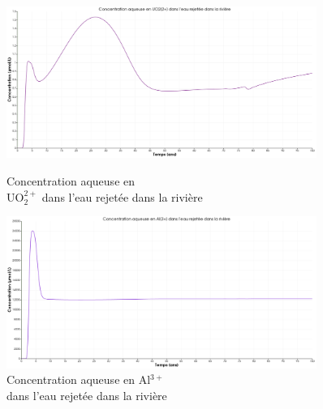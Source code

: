\documentclass{article}
\begin{document}
\begin{figure}[tbh]
    \centering
    \begin{minipage}{0.5\textwidth}
        \centering
        \includegraphics[width=0.9\textwidth]{III_B_2_20.png} 
        \caption{Concentration aqueuse en \\UO$_2^{2+}$ dans l'eau rejetée dans la rivière}
        \label{fig:UO2_riviere_Al}
    \end{minipage}\hfill
    \begin{minipage}{0.5\textwidth}
        \centering
        \includegraphics[width=0.9\textwidth]{III_B_2_21.png} 
        \caption{Concentration aqueuse en Al$^{3+}$ \\dans l'eau rejetée dans la rivière}
        \label{fig:Al_riviere_Al}
    \end{minipage}


\end{figure}
\end{document}
